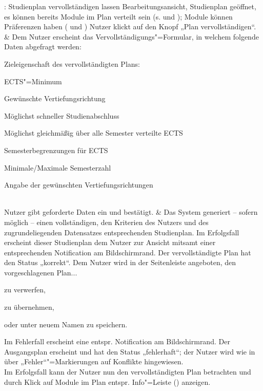 \begin{usecase}{: Studienplan vervollständigen lassen}
	{Bearbeitungsansicht, Studienplan geöffnet, es können bereits Module im Plan verteilt sein (s.  und ); Module können Präferenzen haben ( und )}
	Nutzer klickt auf den Knopf „Plan vervollständigen“.
	& Dem Nutzer erscheint das Vervollständigungs"=Formular, in welchem folgende Daten abgefragt werden:
	\begin{tblitemize}
		\item Zieleigenschaft des vervollständigten Plans:
		\begin{tblitemize}
			\item ECTS"=Minimum
			\item Gewünschte Vertiefungsrichtung
			\item Möglichst schneller Studienabschluss
			\item Möglichst gleichmäßig über alle Semester verteilte ECTS
		\end{tblitemize}
		\item Semesterbegrenzungen für ECTS
		\item Minimale/Maximale Semesterzahl
		\item Angabe der gewünschten Vertiefungsrichtungen
	\end{tblitemize} \\
	\hline
	Nutzer gibt geforderte Daten ein und bestätigt.
	& Das System generiert – sofern möglich – einen vollständigen, den Kriterien des Nutzers und des zugrundeliegenden Datensatzes entsprechenden Studienplan. \newline
	Im Erfolgsfall erscheint dieser Studienplan dem Nutzer zur Ansicht mitsamt einer entsprechenden Notification am Bildschirmrand. Der vervollständigte Plan hat den Status „korrekt“. Dem Nutzer wird in der Seitenleiste angeboten, den vorgeschlagenen Plan...
	\begin{tblitemize}
		\item zu verwerfen,
		\item zu übernehmen,
		\item oder unter neuem Namen zu speichern.
	\end{tblitemize} \newline
	Im Fehlerfall erscheint eine entspr. Notification am Bildschirmrand. Der Ausgangsplan erscheint und hat den Status „fehlerhaft“; der Nutzer wird wie in  über „Fehler“"=Markierungen auf Konflikte hingewiesen. \\
	\hline
	Im Erfolgsfall kann der Nutzer nun den vervollständigten Plan betrachten und durch Klick auf Module im Plan entspr. Info"=Leiste () anzeigen.

\end{usecase}
